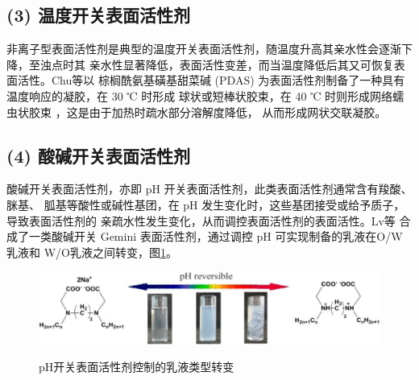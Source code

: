 \documentclass[bachelor,winfonts,replaceperiod]{jnuthesis}
\begin{document}
    \subsection*{(3) 温度开关表面活性剂}
    非离子型表面活性剂是典型的温度开关表面活性剂，随温度升高其亲水性会逐渐下降，至浊点时其
    亲水性显著降低，表面活性变差，而当温度降低后其又可恢复表面活性。Chu\cite{chu2011}等以
    棕榈酰氨基磺基甜菜碱 (PDAS) 为表面活性剂制备了一种具有温度响应的凝胶，在 30 ℃ 时形成
    球状或短棒状胶束，在 40 ℃ 时则形成网络蠕虫状胶束%
    ，这是由于加热时疏水部分溶解度降低，
    从而形成网状交联凝胶。

    \subsection*{(4) 酸碱开关表面活性剂}
    酸碱开关表面活性剂，亦即 pH 开关表面活性剂，此类表面活性剂通常含有羧酸、脒基、
    胍基等酸性或碱性基团，在 pH 发生变化时，这些基团接受或给予质子，导致表面活性剂的
    亲疏水性发生变化，从而调控表面活性剂的表面活性\cite{吕湘亮2018}。Lv等\cite{lv2014}
    合成了一类酸碱开关 Gemini 表面活性剂，通过调控 pH 可实现制备的乳液在O/W乳液和
    W/O乳液之间转变，图\ref{fig:switchable-ph}。
    \begin{figure}[htbp]
        \centering
        \includegraphics[width=.75\textwidth]{figure/switchable-ph.jpg}\\
        \caption{pH开关表面活性剂控制的乳液类型转变\cite{lv2014}}
        \label{fig:switchable-ph}
    \end{figure}
\end{document}

